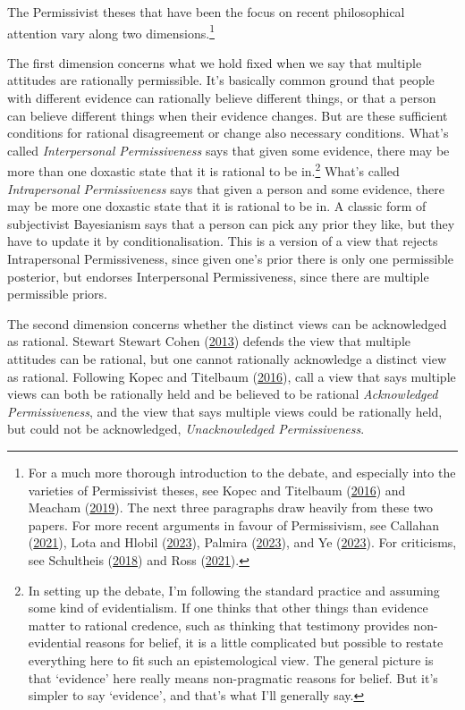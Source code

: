 \documentclass[
  12pt,
  letterpaper,
  DIV=11,
  numbers=noendperiod]{scrreprt}
\begin{document}
The Permissivist theses that have been the focus on recent philosophical
attention vary along two dimensions.\footnote{For a much more thorough
  introduction to the debate, and especially into the varieties of
  Permissivist theses, see Kopec and Titelbaum
  (\protect\hyperlink{ref-KopecTitelbaum2016}{2016}) and Meacham
  (\protect\hyperlink{ref-Meacham2019}{2019}). The next three paragraphs
  draw heavily from these two papers. For more recent arguments in
  favour of Permissivism, see Callahan
  (\protect\hyperlink{ref-Callahan2021}{2021}), Lota and Hlobil
  (\protect\hyperlink{ref-Lota2023}{2023}), Palmira
  (\protect\hyperlink{ref-Palmira2023}{2023}), and Ye
  (\protect\hyperlink{ref-Ye2023}{2023}). For criticisms, see Schultheis
  (\protect\hyperlink{ref-Schultheis2018}{2018}) and Ross
  (\protect\hyperlink{ref-Ross2021}{2021}).}

The first dimension concerns what we hold fixed when we say that
multiple attitudes are rationally permissible. It's basically common
ground that people with different evidence can rationally believe
different things, or that a person can believe different things when
their evidence changes. But are these sufficient conditions for rational
disagreement or change also necessary conditions. What's called
\emph{Interpersonal Permissiveness} says that given some evidence, there
may be more than one doxastic state that it is rational to be
in.\footnote{In setting up the debate, I'm following the standard
  practice and assuming some kind of evidentialism. If one thinks that
  other things than evidence matter to rational credence, such as
  thinking that testimony provides non-evidential reasons for belief, it
  is a little complicated but possible to restate everything here to fit
  such an epistemological view. The general picture is that `evidence'
  here really means non-pragmatic reasons for belief. But it's simpler
  to say `evidence', and that's what I'll generally say.} What's called
\emph{Intrapersonal Permissiveness} says that given a person and some
evidence, there may be more one doxastic state that it is rational to be
in. A classic form of subjectivist Bayesianism says that a person can
pick any prior they like, but they have to update it by
conditionalisation. This is a version of a view that rejects
Intrapersonal Permissiveness, since given one's prior there is only one
permissible posterior, but endorses Interpersonal Permissiveness, since
there are multiple permissible priors.

The second dimension concerns whether the distinct views can be
acknowledged as rational. Stewart Stewart Cohen
(\protect\hyperlink{ref-Cohen2013}{2013}) defends the view that multiple
attitudes can be rational, but one cannot rationally acknowledge a
distinct view as rational. Following Kopec and Titelbaum
(\protect\hyperlink{ref-KopecTitelbaum2016}{2016}), call a view that
says multiple views can both be rationally held and be believed to be
rational \emph{Acknowledged Permissiveness}, and the view that says
multiple views could be rationally held, but could not be acknowledged,
\emph{Unacknowledged Permissiveness}.
\end{document}
